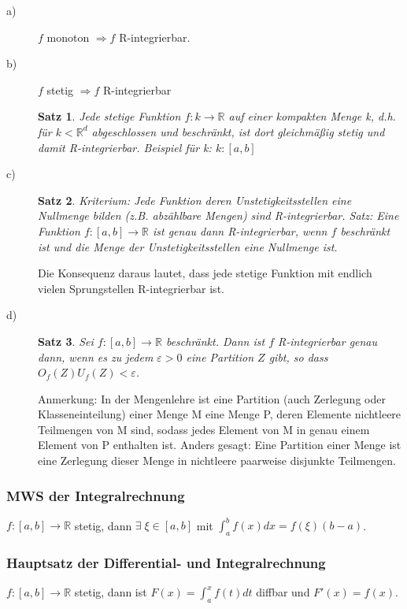 \documentclass[12pt,a4paper]{report}%
\let\harvardleftorig\harvardleft
\newtheorem{satz}{Satz}[section]
\numberwithin{equation}{section}
\newcommand{\R}{\mathbb{R}} %
\newcommand\citeVgl
{\def\harvardleft{(Vgl.\ \global\let\harvardleft\harvardleftorig}%
 \cite
}
\numberwithin{equation}{subsection}
\begin{document}
\begin{description}
\item[a)]
$f$ monoton $\Rightarrow f$ R-integrierbar.
\item[b)]
$f$ stetig $\Rightarrow f$ R-integrierbar
\begin{satz}
\glqq Jede stetige Funktion $f:k \rightarrow \R$ auf einer kompakten Menge k, d.h. für $k<\R^d$ abgeschlossen und beschränkt, ist dort gleichmäßig stetig und damit R-integrierbar.\grqq \cite{HM12}
Beispiel für k: $k:[a,b]$
\end{satz}
\item[c)]
\begin{satz}
Kriterium: Jede Funktion deren Unstetigkeitsstellen eine Nullmenge bilden (z.B. abzählbare Mengen) sind R-integrierbar.
\glqq Satz: Eine Funktion $f:[a,b]\rightarrow \R$ ist genau dann R-integrierbar, wenn $f$ beschränkt ist und die Menge der Unstetigkeitsstellen eine Nullmenge ist. 
\grqq \cite{HM12}
\end{satz}
Die Konsequenz daraus lautet, dass jede stetige Funktion mit endlich vielen Sprungstellen R-integrierbar ist. \citeVgl{HM12}
\item[d)]
\begin{satz}
\glqq Sei $f:[a,b] \rightarrow \R$ beschränkt. Dann ist $f$ R-integrierbar genau dann, wenn es zu jedem $\varepsilon > 0$ eine Partition $Z$ gibt, 
so dass
$O_f(Z)  U_f(Z) < \varepsilon$. \grqq \cite{HM12}
\end{satz}
Anmerkung: \glqq In der Mengenlehre ist eine Partition (auch Zerlegung oder Klasseneinteilung) einer Menge M eine Menge P, deren Elemente nichtleere Teilmengen von M sind, sodass jedes Element von M in genau einem Element von P enthalten ist. Anders gesagt: Eine Partition einer Menge ist eine Zerlegung dieser Menge in nichtleere paarweise disjunkte Teilmengen.\grqq  \cite{wiki}

\end{description}

\subsubsection{MWS der Integralrechnung}
$f:[a,b]\rightarrow\R$ stetig, dann $\exists \; \xi \in[a,b]$ mit $\int_a^b f(x)dx = f(\xi)(b-a)$.

\subsubsection{Hauptsatz der Differential- und Integralrechnung}
$f:[a,b]\rightarrow\R$ stetig, dann ist $F(x) = \int_a^x f(t)dt$ diffbar und $F'(x) = f(x)$.
\end{document}
